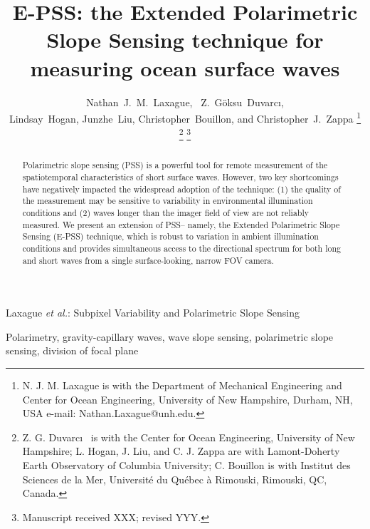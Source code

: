 \documentclass[letterpaper,journal]{IEEEtran}
\begin{document}
	\title{E-PSS: the Extended Polarimetric Slope Sensing technique for measuring ocean surface waves}
	
	\author{Nathan~J.~M.~Laxague,~
		Z.~G\"oksu~Duvarc\i,\\
		Lindsay~Hogan, Junzhe~Liu,
		Christopher~Bouillon, and Christopher~J.~Zappa%
		\thanks{N. J. M. Laxague is with the Department
			of Mechanical Engineering and Center for Ocean Engineering, University of New Hampshire, Durham, NH, USA e-mail: Nathan.Laxague@unh.edu.}%
		\thanks{Z. G. Duvarc\i~ is with the Center for Ocean Engineering, University of New Hampshire; L. Hogan, J. Liu, and C. J. Zappa are with Lamont-Doherty Earth Observatory of Columbia University; C. Bouillon is with Institut des Sciences de la Mer, Université du Québec à Rimouski, Rimouski, QC, Canada.}%
		\thanks{Manuscript received XXX; revised YYY.}}
	
	{Laxague \MakeLowercase{\textit{et al.}}: Subpixel Variability and Polarimetric Slope Sensing}
	
	\maketitle
	
	\begin{abstract}
		Polarimetric slope sensing (PSS) is a powerful tool for remote measurement of the spatiotemporal characteristics of short surface waves. However, two key shortcomings have negatively impacted the widespread adoption of the technique: (1) the quality of the measurement may be sensitive to variability in environmental illumination conditions and (2) waves longer than the imager field of view are not reliably measured. We present an extension of PSS-- namely, the Extended Polarimetric Slope Sensing (E-PSS) technique, which is robust to variation in ambient illumination conditions and provides simultaneous access to the directional spectrum for both long and short waves from a single surface-looking, narrow FOV camera. 
	\end{abstract}
	
	\begin{IEEEkeywords}
		Polarimetry, gravity-capillary waves, wave slope sensing, polarimetric slope sensing, division of focal plane
	\end{IEEEkeywords}
	
\end{document}
